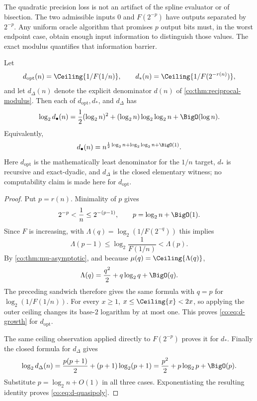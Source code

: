\begin{remark}
The quadratic precision loss is not an artifact of the spline evaluator or of
bisection.  The two admissible inputs $0$ and $F(2^{-p})$ have outputs separated
by $2^{-p}$.  Any uniform oracle algorithm that promises $p$ output bits must,
in the worst endpoint case, obtain enough input information to distinguish
those values.  The exact modulus quantifies that information barrier.
\end{remark}

\begin{corollary}\label{co:cor:d-growth}
Let
\[
 d_{\mathrm{opt}}(n)=\Ceiling{1/F(1/n)},\qquad
 d_*(n)=\Ceiling{1/F(2^{-r(n)})},
\]
and let $d_\Delta(n)$ denote the explicit denominator $d(n)$ of
\cref{co:thm:reciprocal-modulus}.  Then each of
$d_{\mathrm{opt}},d_*$, and $d_\Delta$ has
\begin{equation}\label{co:eq:d-growth}
 \log_2 d_\bullet(n)
 =\frac12(\log_2 n)^2
  +(\log_2n)\log_2\log_2n
  +\BigO(\log n).
\end{equation}
Equivalently,
\begin{equation}\label{co:eq:d-quasipoly}
 d_\bullet(n)=n^{\frac12\log_2n+\log_2\log_2n+\BigO(1)}.
\end{equation}
Here $d_{\mathrm{opt}}$ is the mathematically least denominator for the
$1/n$ target, $d_*$ is recursive and exact-dyadic, and $d_\Delta$ is the
closed elementary witness; no computability claim is made here for
$d_{\mathrm{opt}}$.
\end{corollary}

\begin{proof}
Put $p=r(n)$.  Minimality of $p$ gives
\[
 2^{-p}<\frac1n\le2^{-(p-1)},
 \qquad p=\log_2n+\BigO(1).
\]
Since $F$ is increasing, with
$\Lambda(q)=\log_2(1/F(2^{-q}))$ this implies
\[
 \Lambda(p-1)\le \log_2\frac1{F(1/n)}<\Lambda(p).
\]
By \cref{co:thm:mu-asymptotic}, and because
$\mu(q)=\Ceiling{\Lambda(q)}$,
\[
 \Lambda(q)=\frac{q^2}{2}+q\log_2q+\BigO(q).
\]
The preceding sandwich therefore gives the same formula with $q=p$ for
$\log_2(1/F(1/n))$.  For every $x\ge1$,
$x\le\Ceiling{x}<2x$, so applying the outer ceiling changes its base-$2$
logarithm by at most one.  This proves \eqref{co:eq:d-growth} for
$d_{\mathrm{opt}}$.

The same ceiling observation applied directly to $F(2^{-p})$ proves it for
$d_*$.  Finally the closed formula for $d_\Delta$ gives
\[
 \log_2d_\Delta(n)
 =\frac{p(p+1)}2+(p+1)\log_2(p+1)
 =\frac{p^2}{2}+p\log_2p+\BigO(p).
\]
Substitute $p=\log_2n+O(1)$ in all three cases.  Exponentiating the resulting
identity proves \eqref{co:eq:d-quasipoly}.
\end{proof}

